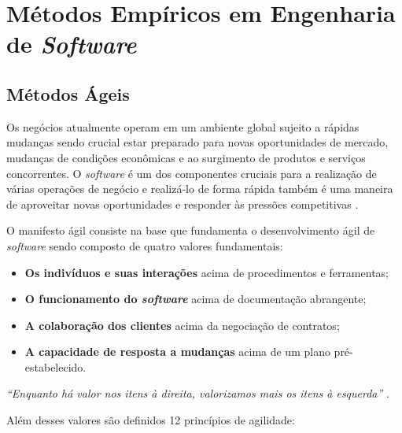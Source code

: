 \chapter{Métodos Empíricos em Engenharia de \textit{Software}}

\section{Métodos Ágeis}
Os negócios atualmente operam em um ambiente global sujeito a rápidas mudanças sendo crucial estar preparado para novas oportunidades de mercado, mudanças de condições econômicas e ao surgimento de produtos e serviços concorrentes. O \textit{software} é um dos componentes cruciais para a realização de várias operações de negócio e realizá-lo de forma rápida também é uma maneira de aproveitar novas oportunidades e responder às pressões competitivas \cite{sommerville_2006}.

O manifesto ágil \cite{beck2001agile} consiste na base que fundamenta o desenvolvimento ágil de
\textit{software} sendo composto de quatro valores fundamentais:

\begin{itemize}
    \item \textbf{Os indivíduos e suas interações} acima de procedimentos e ferramentas;
    \item \textbf{O funcionamento do \textit{software}} acima de documentação abrangente;
    \item \textbf{A colaboração dos clientes} acima da negociação de contratos;
    \item \textbf{A capacidade de resposta a mudanças} acima de um plano pré-estabelecido.
\end{itemize}

\textit{``Enquanto há valor nos itens à direita, valorizamos mais os itens à esquerda''} \cite{beck2001agile}.

Além desses valores são definidos 12 princípios de agilidade:

